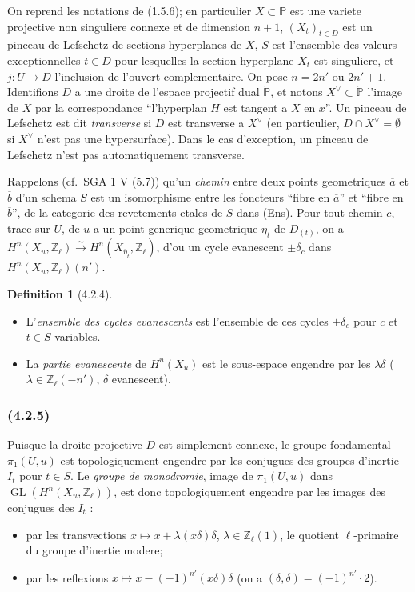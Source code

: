 \documentclass[12pt,a4paper]{article}
\theoremstyle{plain}
\theoremstyle{definition}
\newtheorem{definition}[theorem]{Definition}
\theoremstyle{remark}
\DeclareMathOperator{\GL}{GL}
\newcommand{\bbP}{\mathbb{P}}
\newcommand{\Zl}{\mathbb{Z}_\ell}
\begin{document}
On reprend les notations de (1.5.6); en particulier $X \subset \bbP$ est une variete projective non singuliere connexe et de dimension $n+1$, $(X_t)_{t \in D}$ est un pinceau de Lefschetz de sections hyperplanes de $X$, $S$ est l'ensemble des valeurs exceptionnelles $t \in D$ pour lesquelles la section hyperplane $X_t$ est singuliere, et $j : U \to D$ l'inclusion de l'ouvert complementaire. On pose $n = 2n'$ ou $2n'+1$. Identifions $D$ a une droite de l'espace projectif dual $\check{\bbP}$, et notons $X^\vee \subset \check{\bbP}$ l'image de $X$ par la correspondance ``l'hyperplan $H$ est tangent a $X$ en $x$''. Un pinceau de Lefschetz est dit \emph{transverse} si $D$ est transverse a $X^\vee$ (en particulier, $D \cap X^\vee = \emptyset$ si $X^\vee$ n'est pas une hypersurface). Dans le cas d'exception, un pinceau de Lefschetz n'est pas automatiquement transverse.

Rappelons (cf.~SGA 1 V (5.7)) qu'un \emph{chemin} entre deux points geometriques $\overline{a}$ et $\overline{b}$ d'un schema $S$ est un isomorphisme entre les foncteurs ``fibre en $\overline{a}$'' et ``fibre en $\overline{b}$'', de la categorie des revetements etales de $S$ dans (Ens). Pour tout chemin $c$, trace sur $U$, de $u$ a un point generique geometrique $\overline{\eta}_t$ de $D_{(t)}$, on a $H^n(X_u, \Zl) \xrightarrow{\sim} H^n(X_{\overline{\eta}_t}, \Zl)$, d'ou un cycle evanescent $\pm \delta_c$ dans $H^n(X_u, \Zl)(n')$.

\begin{definition}[4.2.4]
\ \begin{itemize}
\item[(i)] L'\emph{ensemble des cycles evanescents} est l'ensemble de ces cycles $\pm \delta_c$ pour $c$ et $t \in S$ variables.
\item[(ii)] La \emph{partie evanescente} de $H^n(X_u)$ est le sous-espace engendre par les $\lambda \delta$ ($\lambda \in \Zl(-n')$, $\delta$ evanescent).
\end{itemize}
\end{definition}

\subsubsection*{\textup{(4.2.5)}}

Puisque la droite projective $D$ est simplement connexe, le groupe fondamental $\pi_1(U, u)$ est topologiquement engendre par les conjugues des groupes d'inertie $I_t$ pour $t \in S$. Le \emph{groupe de monodromie}, image de $\pi_1(U, u)$ dans $\GL(H^n(X_u, \Zl))$, est donc topologiquement engendre par les images des conjugues des $I_t$ :
\begin{itemize}
\item[$n$ impair :] par les transvections $x \mapsto x + \lambda(x\delta)\delta$, $\lambda \in \Zl(1)$, le quotient $\ell$-primaire du groupe d'inertie modere;
\item[$n$ pair :] par les reflexions $x \mapsto x - (-1)^{n'}(x\delta)\delta$ (on a $(\delta, \delta) = (-1)^{n'} \cdot 2$).
\end{itemize}
\end{document}
